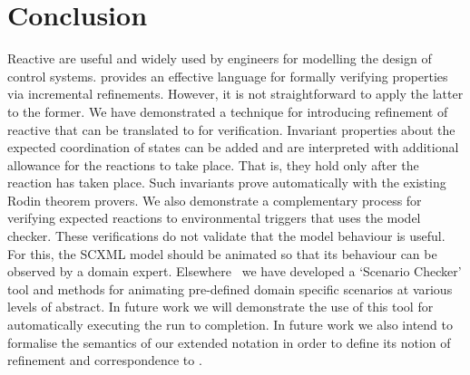 \section{Conclusion}
\label{sec:conc}

Reactive \SCs are useful and widely used by engineers for modelling the design of control systems. 
\EventB provides an effective language for formally verifying properties via incremental refinements.
However, it is not straightforward to apply the latter to the former.
We have demonstrated a technique for introducing refinement of reactive \SCs that can be translated to \EventB for verification.
Invariant properties about the expected coordination of states can be added and are interpreted with additional allowance for the reactions to take place.
That is, they hold only after the reaction has taken place.
Such invariants prove automatically with the existing Rodin theorem provers.
We also demonstrate a complementary process for verifying expected reactions to environmental triggers that uses the \LTL model checker.
These verifications do not validate that the model behaviour is useful.
For this, the SCXML model should be animated so that its behaviour can be observed by a domain expert.
Elsewhere~\cite{snook20JSA} we have developed a `Scenario Checker' tool and methods for animating pre-defined domain specific scenarios at various levels of abstract.
In future work we will demonstrate the use of this tool for automatically executing the run to completion.
In future work we also intend to formalise the semantics of our extended \SCXML notation in order to define its notion of refinement and correspondence to \EventB. 



